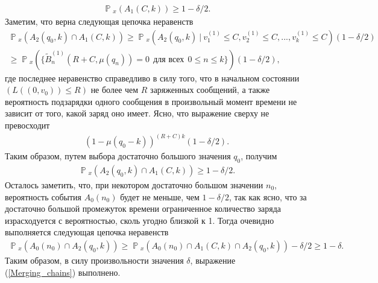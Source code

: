 \documentclass[10pt, reqno]{amsart}
\DeclareMathOperator*{\Pb}{\mathbb{P}}
\begin{document}
\begin{align*}
    \Pb{}_{x}(A_{1}(C, k)) \geq 1 - \delta/2.
\end{align*}
Заметим, что верна следующая цепочка неравенств
\begin{align*}
    \Pb{}_{x}(A_{2}(q_{0}, k) \cap A_{1}(C, k)) \geq \Pb{}_{x}(A_{2}(q_{0}, k) \: | \: v_{1}^{(1)} \leq C, v_{2}^{(1)} \leq C,..., v_{k}^{(1)} \leq C)(1 - \delta/2) \\\geq \Pb{}_{x}(\{\widetilde{B}^{(1)}_{n}(R + C, \mu(q_{n})) = 0 \:\: \text{для всех} \:\: 0 \leq n \leq k \})(1 - \delta/2), 
\end{align*}
где последнее неравенство справедливо в силу того, что в начальном состоянии $(L((0, v_{0})) \leq R)$ не более чем $R$ заряженных сообщений, а также вероятность подзарядки одного сообщения в произвольный момент времени не зависит от того, какой заряд оно имеет. Ясно, что выражение сверху не превосходит
\begin{align*}
    (1 - \mu(q_{0} - k))^{(R + C)k}(1 - \delta/2).
\end{align*}
Таким образом, путем выбора достаточно большого значения $q_{0}$, получим
\begin{align*}
    \Pb{}_{x}(A_{2}(q_{0}, k) \cap A_{1}(C, k)) \geq 1 - \delta/2.
\end{align*}
Осталось заметить, что, при некотором достаточно большом значении $n_{0}$, вероятность события $A_{0}(n_{0})$ будет не меньше, чем $1 - \delta/2$, так как ясно, что за достаточно большой промежуток времени ограниченное количество заряда израсходуется с вероятностью, сколь угодно близкой к 1. Тогда очевидно выполняется следующая цепочка неравенств
\begin{align*}
    \Pb{}_{x}(A_{0}(n_{0}) \cap A_{2}(q_{0}, k)) \geq \Pb{}_{x}(A_{0}(n_{0}) \cap A_{1}(C, k) \cap A_{2}(q_{0}, k)) - \delta/2 \geq 1 - \delta.
\end{align*}
Таким образом, в силу произвольности значения $\delta$, выражение (\ref{Merging_chains}) выполнено.
\end{document}
